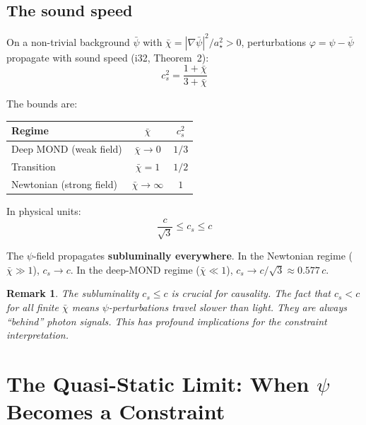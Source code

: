 \documentclass[12pt,a4paper]{article}
\newtheorem{remark}{Remark}[section]
\begin{document}
\subsection{The sound speed}

On a non-trivial background $\bar\psi$ with $\bar\chi = |\nabla\bar\psi|^2/a_\star^2 > 0$, perturbations $\varphi = \psi - \bar\psi$ propagate with sound speed (i32, Theorem~2):
\begin{equation}\label{eq:cs}
\boxed{c_s^2 = \frac{1+\bar\chi}{3+\bar\chi}}
\end{equation}

The bounds are:
\begin{center}
\begin{tabular}{lcc}
\toprule
\textbf{Regime} & $\bar\chi$ & $c_s^2$ \\
\midrule
Deep MOND (weak field) & $\bar\chi \to 0$ & $1/3$ \\
Transition & $\bar\chi = 1$ & $1/2$ \\
Newtonian (strong field) & $\bar\chi \to \infty$ & $1$ \\
\bottomrule
\end{tabular}
\end{center}

In physical units:
\begin{equation}
\frac{c}{\sqrt{3}} \leq c_s \leq c
\end{equation}

The $\psi$-field propagates \textbf{subluminally everywhere}. In the Newtonian
regime ($\bar\chi \gg 1$), $c_s \to c$. In the deep-MOND regime
($\bar\chi \ll 1$), $c_s \to c/\sqrt{3} \approx 0.577\,c$.

\begin{remark}
The subluminality $c_s \leq c$ is crucial for causality. The fact that
$c_s < c$ for all finite $\bar\chi$ means $\psi$-perturbations travel
\emph{slower} than light. They are always ``behind'' photon signals. This
has profound implications for the constraint interpretation.
\end{remark}


\section{The Quasi-Static Limit: When $\psi$ Becomes a Constraint}
\label{sec:quasi-static}
\end{document}
